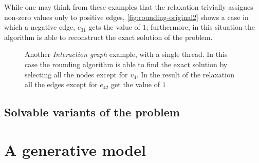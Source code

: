 While one may think from these examples that the relaxation trivially assignes
non-zero values only to positive edges, \autoref{fig:rounding-original2} shows
a case in which a negative edge, $e_{31}$ gets the value of $1$; furthermore,
in this situation the algorithm is able to reconstruct the exact solution of the problem.

\begin{figure}
	\centering
	\caption[Example of rounding algorithm finding the exact solution]{Another \emph{Interaction graph} example, with a single thread. In
		this case the rounding algorithm is able to find the exact solution by
		selecting all the nodes except for $v_4$. In the result of the
		relaxation all the edges except for $e_{42}$ get the value of $1$}%
	\label{fig:rounding-original2}
\end{figure}

\subsection{Solvable variants of the problem}%
\label{sub:solvable_variants_of_the_problem}

\section{A generative model}%
\label{sec:generative_model}




